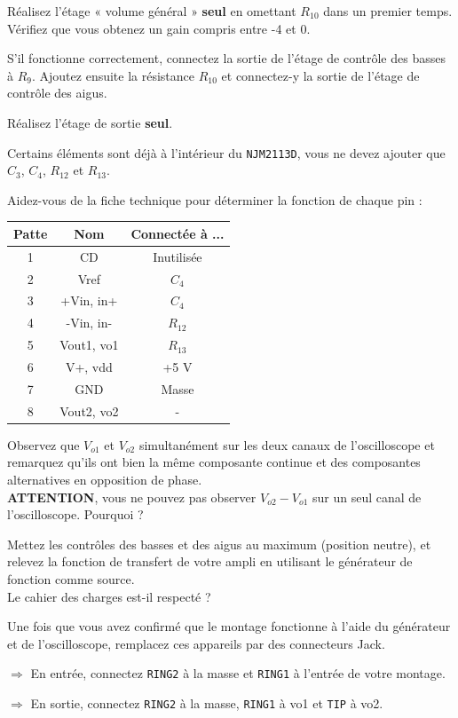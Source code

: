 {
	Réalisez l'étage « volume général » \textbf{seul} en omettant $R_{10}$ dans un premier temps. Vérifiez que vous obtenez un gain compris entre -4 et 0.

	S'il fonctionne correctement, connectez la sortie de l'étage de contrôle des basses à $R_9$. Ajoutez ensuite la résistance $R_{10}$ et connectez-y la sortie de l'étage de contrôle des aigus.
}
{}

{
	Réalisez l'étage de sortie \textbf{seul}.
	\begin{astuce}
		Certains éléments sont déjà à l'intérieur du \texttt{NJM2113D}, vous ne devez ajouter que $C_3$, $C_4$, $R_{12}$ et $R_{13}$.
	\end{astuce}

	\begin{astuce}
		Aidez-vous de la fiche technique pour déterminer la fonction de chaque pin :
		\begin{center}
			\begin{tabular}{ccc}
				Patte & Nom & Connectée à ... \\\toprule
				1 & CD & Inutilisée \\
				2 & Vref & $C_4$ \\
				3 & +Vin, in+ & $C_4$ \\
				4 & -Vin, in- & $R_{12}$ \\
				5 & Vout1, vo1 & $R_{13}$ \\
				6 & V+, vdd & +5 V \\
				7 & GND & Masse \\
				8 & Vout2, vo2 & - \\\bottomrule
			\end{tabular}
		\end{center}
	\end{astuce}

	Observez que $V_{o1}$ et $V_{o2}$ simultanément sur les deux canaux de l'oscilloscope et remarquez qu'ils ont bien la même composante continue et des composantes alternatives en opposition de phase.\\
	\textbf{ATTENTION}, vous ne pouvez pas observer $V_{o2} - V_{o1}$ sur un seul canal de l'oscilloscope. Pourquoi ?
}
{}

{
Mettez les contrôles des basses et des aigus au maximum (position neutre), et relevez la fonction de transfert de votre ampli en utilisant le générateur de fonction comme source.\\
Le cahier des charges est-il respecté ?
}
{}

{
	Une fois que vous avez confirmé que le montage fonctionne à l'aide du générateur et de l'oscilloscope, remplacez ces appareils par des connecteurs Jack.

	$\Rightarrow$ En entrée, connectez \texttt{RING2} à la masse et \texttt{RING1} à l'entrée de votre montage.

	$\Rightarrow$ En sortie, connectez \texttt{RING2} à la masse, \texttt{RING1} à vo1 et \texttt{TIP} à vo2.
}
{}

\endinput
